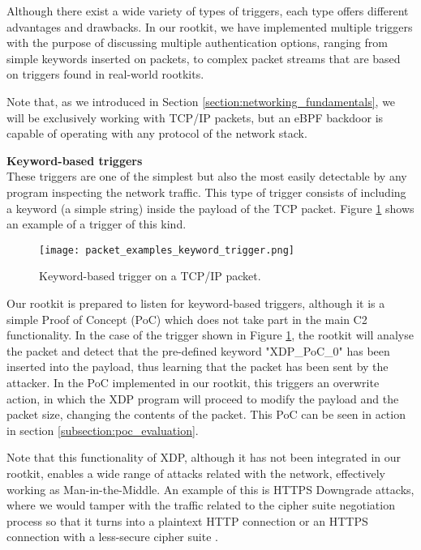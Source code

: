 Although there exist a wide variety of types of triggers, each type offers different advantages and drawbacks. In our rootkit, we have implemented multiple triggers with the purpose of discussing multiple authentication options, ranging from simple keywords inserted on packets, to complex packet streams that are based on triggers found in real-world rootkits.

Note that, as we introduced in Section \ref{section:networking_fundamentals}, we will be exclusively working with TCP/IP packets, but an eBPF backdoor is capable of operating with any protocol of the network stack.

\textbf{Keyword-based triggers}\\
These triggers are one of the simplest but also the most easily detectable by any program inspecting the network traffic. This type of trigger consists of including a keyword (a simple string) inside the payload of the TCP packet. Figure \ref{fig:keyword_trigger} shows an example of a trigger of this kind.

\begin{figure}[htbp]
	\centering
	\texttt{[image: packet\_examples\_keyword\_trigger.png]}
	\caption{Keyword-based trigger on a TCP/IP packet.}
	\label{fig:keyword_trigger}
\end{figure}

Our rootkit is prepared to listen for keyword-based triggers, although it is a simple Proof of Concept (PoC) which does not take part in the main C2 functionality. In the case of the trigger shown in Figure \ref{fig:keyword_trigger}, the rootkit will analyse the packet and detect that the pre-defined keyword "XDP\_PoC\_0" has been inserted into the payload, thus learning that the packet has been sent by the attacker. In the PoC implemented in our rootkit, this triggers an overwrite action, in which the XDP program will proceed to modify the payload and the packet size, changing the contents of the packet. This PoC can be seen in action in section \ref{subsection:poc_evaluation}.

Note that this functionality of XDP, although it has not been integrated in our rootkit, enables a wide range of attacks related with the network, effectively working as Man-in-the-Middle. An example of this is HTTPS Downgrade attacks, where we would tamper with the traffic related to the cipher suite negotiation process so that it turns into a plaintext HTTP connection or an HTTPS connection with a less-secure cipher suite \cite{downgrade_attack}.

